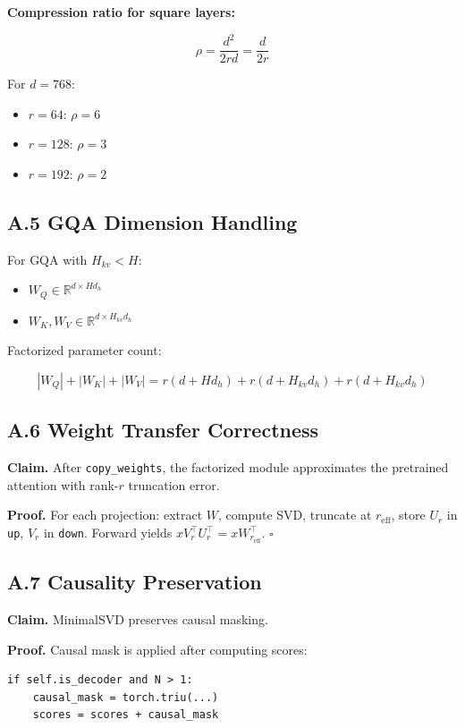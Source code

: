 \textbf{Compression ratio for square layers:}

\[
\rho = \frac{d^2}{2rd} = \frac{d}{2r}
\tag{A.3}
\]

For $d = 768$:
\begin{itemize}
\item $r = 64$: $\rho = 6$
\item $r = 128$: $\rho = 3$
\item $r = 192$: $\rho = 2$

\end{itemize}
\subsection{A.5 GQA Dimension Handling}

For GQA with $H_{kv} < H$:
\begin{itemize}
\item $W_Q \in \mathbb{R}^{d \times H d_h}$
\item $W_K, W_V \in \mathbb{R}^{d \times H_{kv} d_h}$

\end{itemize}
Factorized parameter count:

\[
|W_Q| + |W_K| + |W_V| = r(d + H d_h) + r(d + H_{kv} d_h) + r(d + H_{kv} d_h)
\tag{A.4}
\]

\subsection{A.6 Weight Transfer Correctness}

\textbf{Claim.} After \texttt{copy\_weights}, the factorized module approximates the 
pretrained attention with rank-$r$ truncation error.

\textbf{Proof.} For each projection: extract $W$, compute SVD, truncate at 
$r_\text{eff}$, store $U_r$ in \texttt{up}, $V_r$ in \texttt{down}. Forward yields 
$x V_r^\top U_r^\top = x W_{r_\text{eff}}^\top$. $\square$

\subsection{A.7 Causality Preservation}

\textbf{Claim.} MinimalSVD preserves causal masking.

\textbf{Proof.} Causal mask is applied after computing scores:

\begin{lstlisting}
if self.is_decoder and N > 1:
    causal_mask = torch.triu(...)
    scores = scores + causal_mask
\end{lstlisting}

